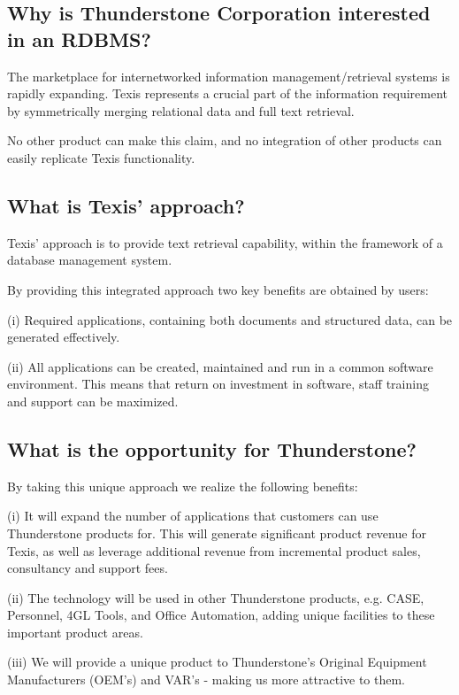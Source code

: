 \subsection{Why is Thunderstone Corporation interested in an RDBMS?}

The marketplace for internetworked information
management/retrieval systems is
rapidly expanding.  Texis represents a
crucial part of the
 information requirement by symmetrically merging
relational data and full text retrieval.

No other product can make this claim, and no integration of other products
can easily replicate Texis functionality.

\subsection{What is Texis' approach?}

Texis' approach is to provide text retrieval capability, within the
framework of a database management system.

By providing this integrated approach two key benefits are obtained by
users:

(i) Required applications, containing both documents and structured data,
can be generated effectively.

(ii) All applications can be created, maintained and run in a common
software environment.  This means that return on investment in software,
staff training and support can be maximized.

\subsection{What is the opportunity for Thunderstone?}

By taking this unique approach we realize the following benefits:

(i) It will expand the number of applications that customers can use
Thunderstone products for.  This will generate significant product revenue for
Texis, as well as leverage additional revenue from incremental
product sales, consultancy and support fees.

(ii)    The technology will be used in other Thunderstone products, e.g. CASE, Personnel,
4GL Tools, and Office Automation, adding unique facilities to these
important product areas.

(iii)   We will provide a unique product to Thunderstone's Original Equipment
Manufacturers (OEM's) and VAR's - making us more attractive to them.

